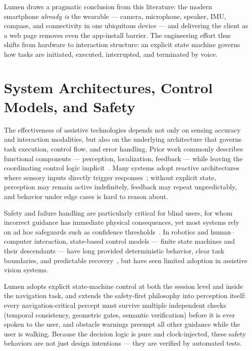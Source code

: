 Lumen draws a pragmatic conclusion from this literature: the modern smartphone
\emph{already is} the wearable --- camera, microphone, speaker, IMU, compass, and
connectivity in one ubiquitous device --- and delivering the client as a web page
removes even the app-install barrier. The engineering effort thus shifts from
hardware to interaction structure: an explicit state machine governs how tasks are
initiated, executed, interrupted, and terminated by voice.

\section{System Architectures, Control Models, and Safety}
\label{sec:architectures_control_safety}

The effectiveness of assistive technologies depends not only on sensing accuracy and
interaction modalities, but also on the underlying architecture that governs task
execution, control flow, and error handling. Prior work commonly describes functional
components --- perception, localization, feedback --- while leaving the coordinating
control logic implicit~\cite{tapu2014wearable, dakopoulos2010wearable}. Many systems
adopt reactive architectures where sensory inputs directly trigger
responses~\cite{porzi2018assistive}; without explicit state, perception may remain
active indefinitely, feedback may repeat unpredictably, and behavior under edge cases
is hard to reason about.

Safety and failure handling are particularly critical for blind users, for whom
incorrect guidance has immediate physical consequences, yet most systems rely on ad
hoc safeguards such as confidence thresholds~\cite{fernandes2019review}. In robotics
and human--computer interaction, state-based control models --- finite state machines
and their descendants --- have long provided deterministic behavior, clear task
boundaries, and predictable recovery~\cite{brooks1986robust,
colledanchise2018behavior}, but have seen limited adoption in assistive vision
systems.

Lumen adopts explicit state-machine control at both the session level and inside the
navigation task, and extends the safety-first philosophy into perception itself:
every navigation-critical percept must survive multiple independent checks (temporal
consistency, geometric gates, semantic verification) before it is ever spoken to the
user, and obstacle warnings preempt all other guidance while the user is walking.
Because the decision logic is pure and clock-injected, these safety behaviors are not
just design intentions --- they are verified by automated tests.

